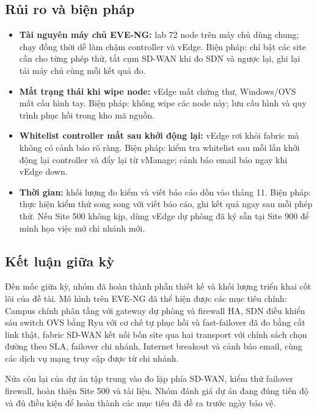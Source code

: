 \subsection{Rủi ro và biện pháp}

\begin{itemize}
    \item \textbf{Tài nguyên máy chủ EVE-NG:} lab 72 node trên máy chủ dùng chung; chạy đồng thời dễ làm chậm controller và vEdge. Biện pháp: chỉ bật các site cần cho từng phép thử, tắt cụm SD-WAN khi đo SDN và ngược lại, ghi lại tải máy chủ cùng mỗi kết quả đo.
    \item \textbf{Mất trạng thái khi wipe node:} vEdge mất chứng thư, Windows/OVS mất cấu hình tay. Biện pháp: không wipe các node này; lưu cấu hình và quy trình phục hồi trong kho mã nguồn.
    \item \textbf{Whitelist controller mất sau khởi động lại:} vEdge rơi khỏi fabric mà không có cảnh báo rõ ràng. Biện pháp: kiểm tra whitelist sau mỗi lần khởi động lại controller và đẩy lại từ vManage; cảnh báo email báo ngay khi vEdge down.
    \item \textbf{Thời gian:} khối lượng đo kiểm và viết báo cáo dồn vào tháng 11. Biện pháp: thực hiện kiểm thử song song với viết báo cáo, ghi kết quả ngay sau mỗi phép thử. Nếu Site 500 không kịp, dùng vEdge dự phòng đã ký sẵn tại Site 900 để minh họa việc mở chi nhánh mới.
\end{itemize}

\subsection{Kết luận giữa kỳ}

Đến mốc giữa kỳ, nhóm đã hoàn thành phần thiết kế và khối lượng triển khai cốt lõi của đề tài. Mô hình trên EVE-NG đã thể hiện được các mục tiêu chính: Campus chính phân tầng với gateway dự phòng và firewall HA, SDN điều khiển sáu switch OVS bằng Ryu với cơ chế tự phục hồi và fast-failover đã đo bằng cắt link thật, fabric SD-WAN kết nối bốn site qua hai transport với chính sách chọn đường theo SLA, failover chi nhánh, Internet breakout và cảnh báo email, cùng các dịch vụ mạng truy cập được từ chi nhánh.

Nửa còn lại của dự án tập trung vào đo lặp phía SD-WAN, kiểm thử failover firewall, hoàn thiện Site 500 và tài liệu. Nhóm đánh giá dự án đang đúng tiến độ và đủ điều kiện để hoàn thành các mục tiêu đã đề ra trước ngày bảo vệ.

